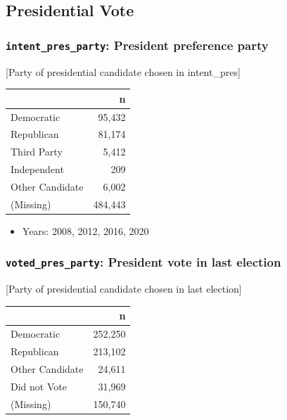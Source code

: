 \documentclass[10pt,article,oneside]{memoir}
\theoremstyle{definition}
\begin{document}
\subsection{Presidential Vote}\label{presidential-vote}

\subsubsection{\texorpdfstring{\texttt{intent\_pres\_party}: President
preference
party}{intent\_pres\_party: President preference party}}\label{intent_pres_party-president-preference-party}

{[}Party of presidential candidate chosen in intent\_pres{]}

\begin{table}[H]
\centering
\begin{tabular}[t]{lr}
\toprule
 & n\\
\midrule
Democratic & 95,432\\
Republican & 81,174\\
Third Party & 5,412\\
Independent & 209\\
Other Candidate & 6,002\\
(Missing) & 484,443\\
\bottomrule
\end{tabular}
\end{table}

\begin{itemize}
\tightlist
\item
  Years: 2008, 2012, 2016, 2020
\end{itemize}

\subsubsection{\texorpdfstring{\texttt{voted\_pres\_party}: President
vote in last
election}{voted\_pres\_party: President vote in last election}}\label{voted_pres_party-president-vote-in-last-election}

{[}Party of presidential candidate chosen in last election{]}

\begin{table}[H]
\centering
\begin{tabular}[t]{lr}
\toprule
 & n\\
\midrule
Democratic & 252,250\\
Republican & 213,102\\
Other Candidate & 24,611\\
Did not Vote & 31,969\\
(Missing) & 150,740\\
\bottomrule
\end{tabular}
\end{table}
\end{document}
